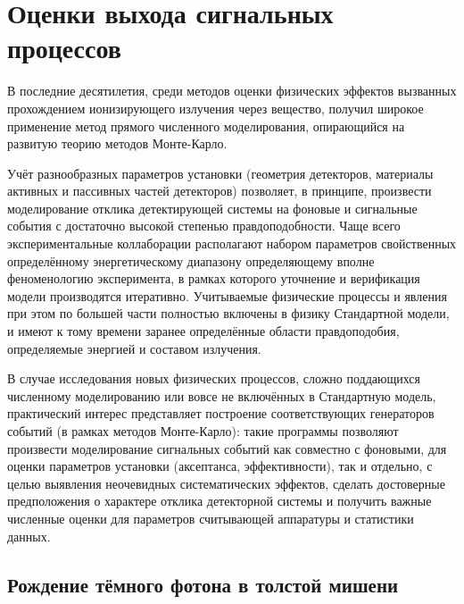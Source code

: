 \section{Оценки выхода сигнальных процессов}



В последние десятилетия, среди методов оценки физических эффектов вызванных
прохождением ионизирующего излучения через вещество, получил широкое применение
метод прямого численного моделирования, опирающийся на развитую теорию
методов Монте-Карло.

Учёт разнообразных параметров установки (геометрия детекторов, материалы
активных и пассивных частей детекторов) позволяет, в принципе, произвести
моделирование отклика детектирующей системы на фоновые и сигнальные события с
достаточно высокой степенью правдоподобности. Чаще всего экспериментальные
коллаборации располагают набором параметров свойственных определённому
энергетическому диапазону определяющему вполне феноменологию эксперимента,
в рамках которого уточнение и верификация модели производятся итеративно.
Учитываемые физические
процессы и явления при этом по большей части полностью включены в физику
Стандартной модели, и имеют к тому времени заранее определённые области
правдоподобия, определяемые энергией и составом излучения.

В случае исследования новых физических процессов, сложно поддающихся численному
моделированию или вовсе не включённых в Стандартную модель, практический
интерес представляет построение соответствующих генераторов событий (в рамках
методов Монте-Карло): такие программы позволяют произвести моделирование
сигнальных событий как совместно с фоновыми, для оценки параметров установки
(аксептанса, эффективности), так и отдельно, с целью выявления неочевидных
систематических эффектов, сделать достоверные предположения о характере отклика
детекторной системы и получить важные численные оценки для параметров
считывающей аппаратуры и статистики данных.

\subsection{Рождение тёмного фотона в толстой мишени}

